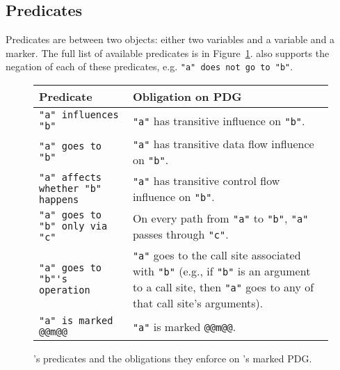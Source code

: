 \subsection{Predicates}
%
Predicates are between two objects: either two variables and a variable and a marker.
%
The full list of available predicates is in Figure~\ref{f:predicates}.
%
\syslang{} also supports the negation of each of these predicates, e.g. \lstinline[language=CNL]|"a" does not go to "b"|.

\begin{figure}[h]
  \small
  \begin{tabular}{|p{6cm}|p{8cm}|}
      \hline
      \syslang{} Predicate                                                       &  Obligation on PDG                   \\ \hline
      \lstinline[language=CNL]|"a" influences "b"|                              & \lstinline[language=CNL]|"a"| has transitive influence on \lstinline[language=CNL]|"b"|. \\
      \hline
      \lstinline[language=CNL]|"a" goes to "b"|                                 &  \lstinline[language=CNL]|"a"| has transitive data flow influence on \lstinline[language=CNL]|"b"|. \\
      \hline
      \lstinline[language=CNL]|"a" affects whether "b" happens|                 & \lstinline[language=CNL]|"a"| has transitive control flow influence on \lstinline[language=CNL]|"b"|. \\
      
      \hline
      \lstinline[language=CNL]|"a" goes to "b" only via "c"|                    & On every path from \lstinline[language=CNL]|"a"| to \lstinline[language=CNL]|"b"|,
                                                                                  \lstinline[language=CNL]|"a"| passes through \lstinline[language=CNL]|"c"|. \\
      \hline
      \lstinline[language=CNL]|"a" goes to "b"'s operation|                     & \lstinline[language=CNL]|"a"| goes to the call site associated with \lstinline[language=CNL]|"b"|
                                                                                 (e.g., if \lstinline[language=CNL]|"b"| is an argument to a call site, then \lstinline[language=CNL]|"a"| goes to any of that call site's arguments). \\
      \hline 
      \lstinline[language=CNL]|"a" is marked @@m@@|                             & \lstinline[language=CNL]|"a"| is marked \lstinline[language=CNL]|@@m@@|. \\
             
    \hline
  \end{tabular}
    \caption{\syslang's predicates and the obligations they enforce on \sys's marked PDG.}
    \label{f:predicates}
\end{figure}

